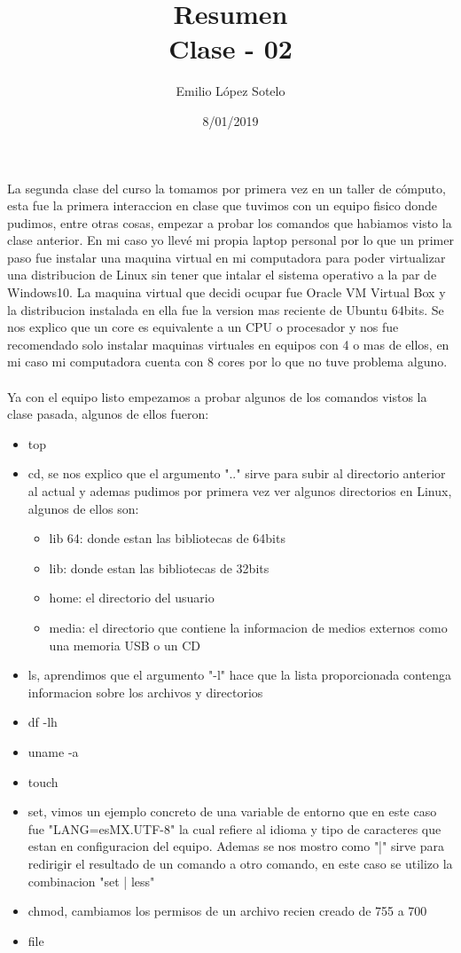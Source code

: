 \documentclass[letterpaper, 12pt, oneside]{article}
\title{Resumen\\Clase - 02}
\author{Emilio López Sotelo}
\date{8/01/2019}
\begin{document}
	\maketitle
	La segunda clase del curso la tomamos por primera vez en un taller de cómputo, esta fue la primera interaccion en clase que tuvimos con un equipo fisico donde pudimos, entre otras cosas, empezar a probar los comandos que habiamos visto la clase anterior. En mi caso yo llevé mi propia laptop personal por lo que un primer paso fue instalar una maquina virtual en mi computadora para poder virtualizar una distribucion de Linux sin tener que intalar el sistema operativo a la par de Windows10. La maquina virtual que decidi ocupar fue Oracle VM Virtual Box y la distribucion instalada en ella fue la version mas reciente de Ubuntu 64bits. Se nos explico que un core es equivalente a un CPU o procesador y nos fue recomendado solo instalar maquinas virtuales en equipos con 4 o mas de ellos, en mi caso mi computadora cuenta con 8 cores por lo que no tuve problema alguno.
	\\
	\\
	Ya con el equipo listo empezamos a probar algunos de los comandos vistos la clase pasada, algunos de ellos fueron:
	\begin{itemize}
		\item top
		\item cd, se nos explico que el argumento ".." sirve para subir al directorio anterior al actual y ademas pudimos por primera vez ver algunos directorios en Linux, algunos de ellos son:
		\begin{itemize} 
			\item lib 64: donde estan las bibliotecas de 64bits
			\item lib: donde estan las bibliotecas de 32bits
			\item home: el directorio del usuario
			\item media: el directorio que contiene la informacion de medios externos como una memoria USB o un CD
		\end{itemize}
		\item ls, aprendimos que el argumento "-l" hace que la lista proporcionada contenga informacion sobre los archivos y directorios
		\item df -lh
		\item uname -a
		\item touch
		\item set, vimos un ejemplo concreto de una variable de entorno que en este caso fue "LANG=esMX.UTF-8" la cual refiere al idioma y tipo de caracteres que estan en configuracion del equipo. Ademas se nos mostro como "|" sirve para redirigir el resultado de un comando a otro comando, en este caso se utilizo la combinacion "set | less"
		\item chmod, cambiamos los permisos de un archivo recien creado de 755 a 700
		\item file
		\
	\end{itemize}
\end{document}
